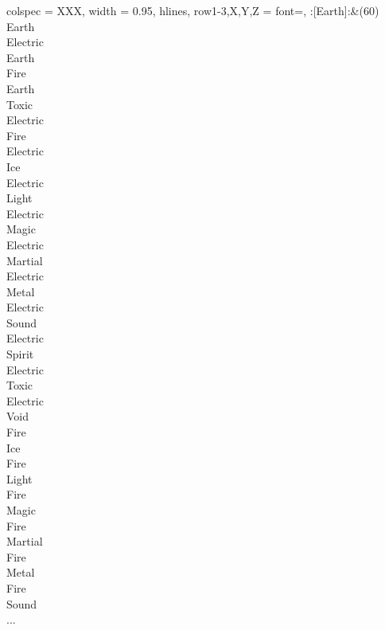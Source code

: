 \begin{longtblr}[
	caption = {2v1 Defending Weak},
	label = {2v1-Defending-Weak},
]{
	colspec = {XXX}, width = 0.95\linewidth,
	hlines,
	row{1-3,X,Y,Z} = {font=\bfseries},
}
	:[Earth]:&{(60)\\
	Earth \\
	Electric \\
	Earth \\
	Fire \\
	Earth \\
	Toxic \\
	Electric \\
	Fire \\
	Electric \\
	Ice \\
	Electric \\
	Light \\
	Electric \\
	Magic \\
	Electric \\
	Martial \\
	Electric \\
	Metal \\
	Electric \\
	Sound \\
	Electric \\
	Spirit \\
	Electric \\
	Toxic \\
	Electric \\
	Void \\
	Fire \\
	Ice \\
	Fire \\
	Light \\
	Fire \\
	Magic \\
	Fire \\
	Martial \\
	Fire \\
	Metal \\
	Fire \\
	Sound \\
	...\\
	}\\


\end{longtblr}
